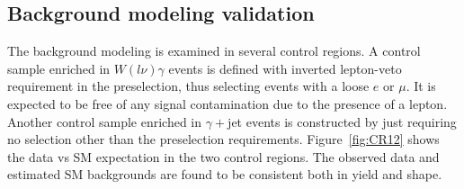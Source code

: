 \subsection{Background modeling validation}

The background modeling is examined in several control regions. A control sample enriched in $W(l\nu)\gamma$ events is defined with inverted lepton-veto requirement in the preselection, thus selecting events with a loose $e$ or $\mu$. It is expected to be free of any signal contamination due to the presence of a lepton. Another control sample enriched in $\gamma +$jet events is constructed by just requiring no selection other than the preselection requirements. Figure~\ref{fig:CR12} shows the data vs SM expectation in the two control regions. The observed data and estimated SM backgrounds are found to be consistent both in yield and shape.

